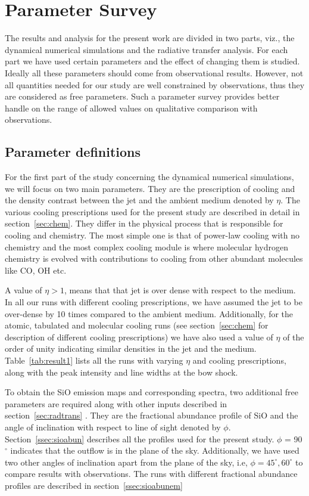 \documentclass[useAMS,usenatbib]{mn2e}
\begin{document}




\section{Parameter Survey}
\label{sec:parasurvey}
The results and analysis for the present work are divided in two parts,
viz., the dynamical numerical simulations and the
radiative transfer analysis. For each part we have used certain parameters
and the effect of changing them is studied. Ideally all these parameters should come from observational
results. However, not all quantities needed for our study are well
constrained by observations, thus they are considered as
free parameters. Such a parameter survey provides better handle on the range of allowed
values on qualitative comparison with observations. 
%

\subsection{Parameter definitions}
\label{ssec:paradef}
For the first part of the study concerning the dynamical numerical
simulations, we will focus on two main parameters. They are the
prescription of cooling and the density contrast between the jet and
the ambient medium denoted by $\eta$. The various cooling prescriptions used for the present study are
described in detail in section~\ref{sec:chem}. They differ in the
physical process that is responsible for cooling and chemistry. The
most simple one is that of power-law cooling with no chemistry and the
most complex cooling module is where molecular hydrogen chemistry is
evolved with contributions to cooling from other abundant molecules
like CO, OH etc. 
%

A value of $\eta > 1$, means that
that jet is over dense with respect to the medium. In all our runs with
different cooling prescriptions, we have assumed the jet to be
over-dense by 10 times compared to the ambient medium. Additionally, for
the atomic, tabulated and molecular cooling runs (see section~\ref{sec:chem}
for description of different cooling prescriptions) we have also used a
value of $\eta$ of the order of unity indicating similar densities in
the jet and the medium. Table~\ref{tab:result1} lists all the runs with
varying $\eta$ and cooling prescriptions, along with the peak
intensity and line widths at the bow shock.
%

To obtain the SiO emission maps and corresponding
spectra, two additional free parameters are required along with other
inputs described in section~\ref{sec:radtrans} . They are
the fractional abundance profile of SiO and the angle of inclination with
respect to line of sight denoted by $\phi$. Section~\ref{ssec:sioabun}
describes all the profiles used for the present study. $\phi$ = 90$^{\circ}$ indicates that
the outflow is in the plane of the sky. 
Additionally, we have used two other angles of inclination apart from the
plane of the sky, i.e, $\phi = 45^{\circ}, 60^{\circ}$ to compare
results with observations. The runs with different fractional
abundance profiles are described in section~\ref{ssec:sioabunem}
\end{document}
